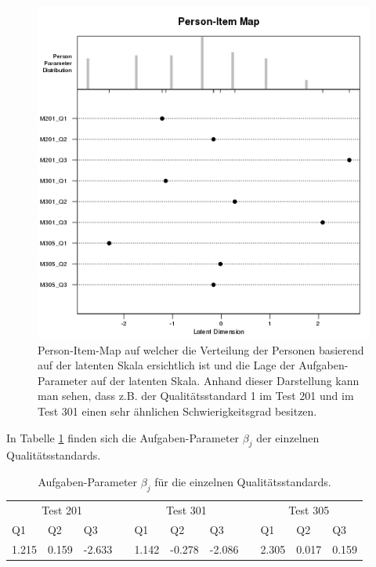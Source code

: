  \begin{figure}[htbp]
 
 \centering
 \includegraphics[width=0.8\linewidth]{graphics/PersonItemMap.png}
 \caption{Person-Item-Map auf welcher die Verteilung der Personen basierend auf der latenten Skala ersichtlich ist und die Lage der Aufgaben-Parameter auf der latenten Skala. Anhand dieser Darstellung kann man sehen, dass z.B. der Qualitätsstandard 1 im Test 201 und im Test 301 einen sehr ähnlichen Schwierigkeitsgrad besitzen. }
 \label{fig:PersonItemMapQ}
 \end{figure}
 
 In Tabelle \ref{tab:betaQ} finden sich die Aufgaben-Parameter $\beta_j$ der einzelnen Qualitätsstandards.
 
 \begin{table}[htbp]
   \centering
 \begin{tabular}{@{}lllllllllll@{}}
 \toprule
  \multicolumn{3}{c}{Test 201} &&  \multicolumn{3}{c}{Test 301}&&  \multicolumn{3}{c}{Test 305}\\ 
   \cmidrule{1-3}\cmidrule{5-7}\cmidrule{9-11}
  Q1 & Q2 & Q3 && Q1 & Q2 & Q3 && Q1 & Q2 & Q3  \\ 
 \midrule
   1.215 & 0.159 & -2.633 && 1.142 & -0.278 & -2.086 && 2.305 & 0.017 & 0.159   \\ 
 
 \bottomrule
 \end{tabular} 
   \caption{Aufgaben-Parameter $\beta_j$ für die einzelnen Qualitätsstandards. }
   \label{tab:betaQ}
 \end{table}
 
